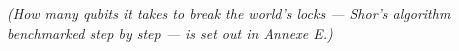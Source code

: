 % 
% 
% 
% 
% 
\textit{(How many qubits it takes to break the world's locks --- Shor's algorithm benchmarked step by step --- is set out in Annexe E.)}

